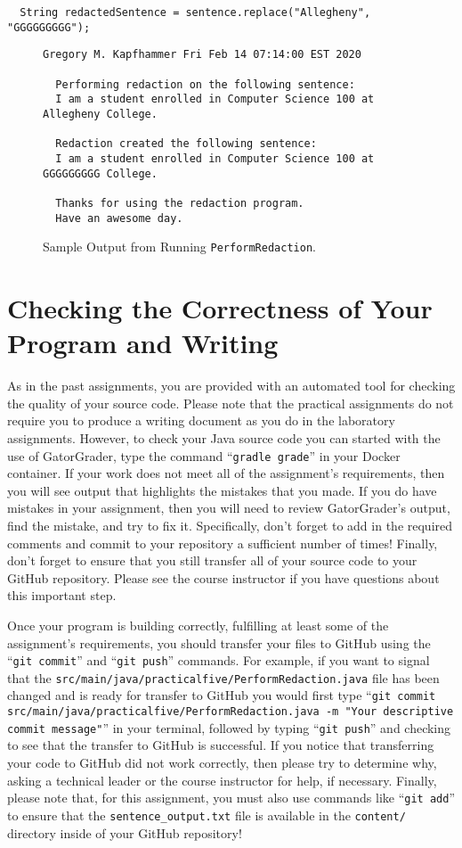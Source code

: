 \documentclass[11pt]{article}
\newcommand{\mainprogram}{\lstinline{PerformRedaction}}
\newcommand{\mainprogramsource}{\lstinline{src/main/java/practicalfive/PerformRedaction.java}}
\newcommand{\gatorgraderstart}{\command{gradle grade}}
\newcommand{\gitcommit}{\command{git commit}}
\newcommand{\gitpush}{\command{git push}}
\newcommand{\gitcommitmainprogram}{\command{git commit src/main/java/practicalfive/PerformRedaction.java -m "Your
descriptive commit message"}}
\newcommand{\command}[1]{``\lstinline{#1}''}
\newcommand{\program}[1]{\lstinline{#1}}
\begin{document}
\begin{verbatim}
  String redactedSentence = sentence.replace("Allegheny", "GGGGGGGGG");
\end{verbatim}

\begin{figure}[tb]
\begin{Verbatim}[commandchars=\\\{\}]
  Gregory M. Kapfhammer Fri Feb 14 07:14:00 EST 2020

  Performing redaction on the following sentence:
  I am a student enrolled in Computer Science 100 at Allegheny College.

  Redaction created the following sentence:
  I am a student enrolled in Computer Science 100 at GGGGGGGGG College.

  Thanks for using the redaction program.
  Have an awesome day.
\end{Verbatim}
\vspace*{-.1in}
\caption{Sample Output from Running \mainprogram.}
\label{mad}
\end{figure}

\section*{Checking the Correctness of Your Program and Writing}

As in the past assignments, you are provided with an automated tool for checking
the quality of your source code. Please note that the practical assignments do
not require you to produce a writing document as you do in the laboratory
assignments. However, to check your Java source code you can started with the
use of GatorGrader, type the command \gatorgraderstart{} in your Docker
container. If your work does not meet all of the assignment's requirements, then
you will see output that highlights the mistakes that you made. If you do have
mistakes in your assignment, then you will need to review GatorGrader's output,
find the mistake, and try to fix it. Specifically, don't forget to add in the
required comments and commit to your repository a sufficient number of times!
Finally, don't forget to ensure that you still transfer all of your source code
to your GitHub repository. Please see the course instructor if you have
questions about this important step.

Once your program is building correctly, fulfilling at least some of the
assignment's requirements, you should transfer your files to GitHub using the
\gitcommit{} and \gitpush{} commands. For example, if you want to signal that
the \mainprogramsource{} file has been changed and is ready for transfer to
GitHub you would first type \gitcommitmainprogram{} in your terminal, followed
by typing \gitpush{} and checking to see that the transfer to GitHub is
successful. If you notice that transferring your code to GitHub did not work
correctly, then please try to determine why, asking a technical leader or the
course instructor for help, if necessary.
%
Finally, please note that, for this assignment, you must also use commands like
\command{git add} to ensure that the \program{sentence_output.txt} file is
available in the \program{content/} directory inside of your GitHub repository!
\end{document}

